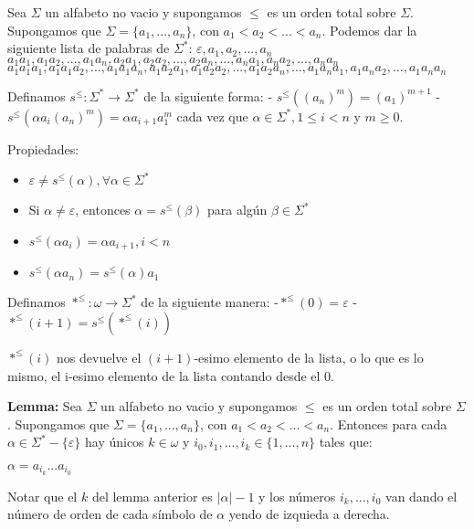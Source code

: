 \documentclass{article}
\begin{document}
\begin{flushleft}
Sea $\Sigma$ un alfabeto no vacio y supongamos $\leq$ es un orden total sobre $\Sigma$. Supongamos que $\Sigma = \{a_1, ..., a_n\}$, con $a_1 < a_2 < ... < a_n$. Podemos dar la siguiente lista de palabras de $\Sigma^*$:\linebreak
$\varepsilon, a_1, a_2, ..., a_n$\linebreak
$a_1a_1, a_1a_2, ..., a_1a_n, a_2a_1, a_2a_2, ..., a_2a_n, ..., a_na_1,a_na_2, ..., a_na_n$\linebreak
$a_1a_1a_1, a_1a_1a_2, ..., a_1a_1a_n, a_1a_2a_1, a_1a_2a_2, ..., a_1a_2a_n, ..., a_1a_na_1, a_1a_na_2, ..., a_1a_na_n$\linebreak

Definamos $s^{\leq} : \Sigma^* \rightarrow \Sigma^*$ de la siguiente forma:\linebreak
\hspace*{7ex}- $s^{\leq}((a_n)^m) = (a_1)^{m+1}$\linebreak
\hspace*{7ex}- $s^{\leq}(\alpha a_i(a_n)^m) = \alpha a_{i+1}a_1^{m}$ cada vez que $\alpha \in \Sigma^*, 1 \leq i < n$ y $m \geq 0$. \linebreak

Propiedades:
\begin{itemize}
    \item $\varepsilon \neq s^{\leq}(\alpha), \forall \alpha \in \Sigma^*$
    \item Si $\alpha \neq \varepsilon$, entonces $\alpha = s^{\leq}(\beta)$ para algún $\beta \in \Sigma^*$
    \item $s^{\leq}(\alpha a_i) = \alpha a_{i+1}, i < n$
    \item $s^{\leq}(\alpha a_n) = s^{\leq}(\alpha)a_1$
\end{itemize}

Definamos $*^{\leq} : \omega \rightarrow \Sigma^*$ de la siguiente manera:\linebreak
\hspace*{7ex} -$*^{\leq}(0) = \varepsilon$\linebreak
\hspace*{7ex} -$*^{\leq}(i+1) = s^{\leq}(*^{\leq}(i))$\linebreak

$*^{\leq}(i)$ nos devuelve el $(i+1)$-esimo elemento de la lista, o lo que es lo mismo, el i-esimo elemento de la lista contando desde el 0.\linebreak

\textbf{Lemma:} Sea $\Sigma$ un alfabeto no vacio y supongamos $\leq$ es un orden total sobre $\Sigma$. Supongamos que $\Sigma = \{a_1, ..., a_n\}$, con $a_1 < a_2 < ... < a_n$. Entonces para cada $\alpha \in \Sigma^* - \{\varepsilon\}$ hay únicos $k \in \omega$ y $i_0, i_1, ..., i_k \in \{1, ..., n\}$ tales que:
\begin{center}
    $\alpha = a_{i_k}...a_{i_0}$
\end{center}
Notar que el $k$ del lemma anterior es $|\alpha| - 1$ y los números $i_k, ..., i_0$ van dando el número de orden de cada símbolo de $\alpha$ yendo de izquieda a derecha.\linebreak


\end{flushleft}
\end{document}
